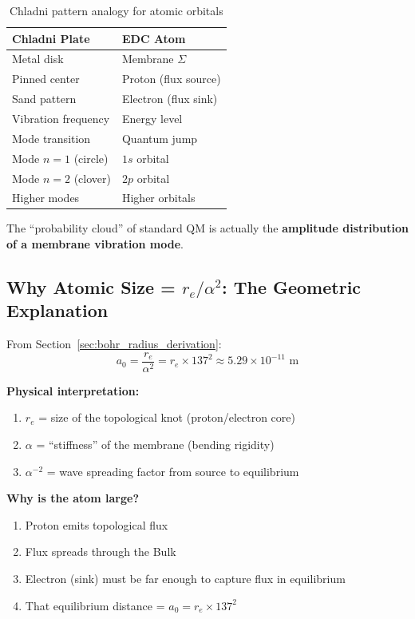 \begin{table}[h]
\centering
\begin{tabular}{|l|l|}
\hline
\textbf{Chladni Plate} & \textbf{EDC Atom} \\
\hline
Metal disk & Membrane $\Sigma$ \\
Pinned center & Proton (flux source) \\
Sand pattern & Electron (flux sink) \\
Vibration frequency & Energy level \\
Mode transition & Quantum jump \\
\hline
Mode $n=1$ (circle) & $1s$ orbital \\
Mode $n=2$ (clover) & $2p$ orbital \\
Higher modes & Higher orbitals \\
\hline
\end{tabular}
\caption{Chladni pattern analogy for atomic orbitals}
\label{tab:chladni}
\end{table}

The ``probability cloud'' of standard QM is actually the \textbf{amplitude distribution of a membrane vibration mode}.

\subsection{Why Atomic Size = $r_e/\alpha^2$: The Geometric Explanation}
\label{subsec:size_explanation}

From Section~\ref{sec:bohr_radius_derivation}:
\begin{equation}
a_0 = \frac{r_e}{\alpha^2} = r_e \times 137^2 \approx 5.29 \times 10^{-11} \text{ m}
\end{equation}

\textbf{Physical interpretation:}
\begin{enumerate}
    \item $r_e$ = size of the topological knot (proton/electron core)
    \item $\alpha$ = ``stiffness'' of the membrane (bending rigidity)
    \item $\alpha^{-2}$ = wave spreading factor from source to equilibrium
\end{enumerate}

\textbf{Why is the atom large?}
\begin{enumerate}
    \item Proton emits topological flux
    \item Flux spreads through the Bulk
    \item Electron (sink) must be far enough to capture flux in equilibrium
    \item That equilibrium distance = $a_0 = r_e \times 137^2$
\end{enumerate}

